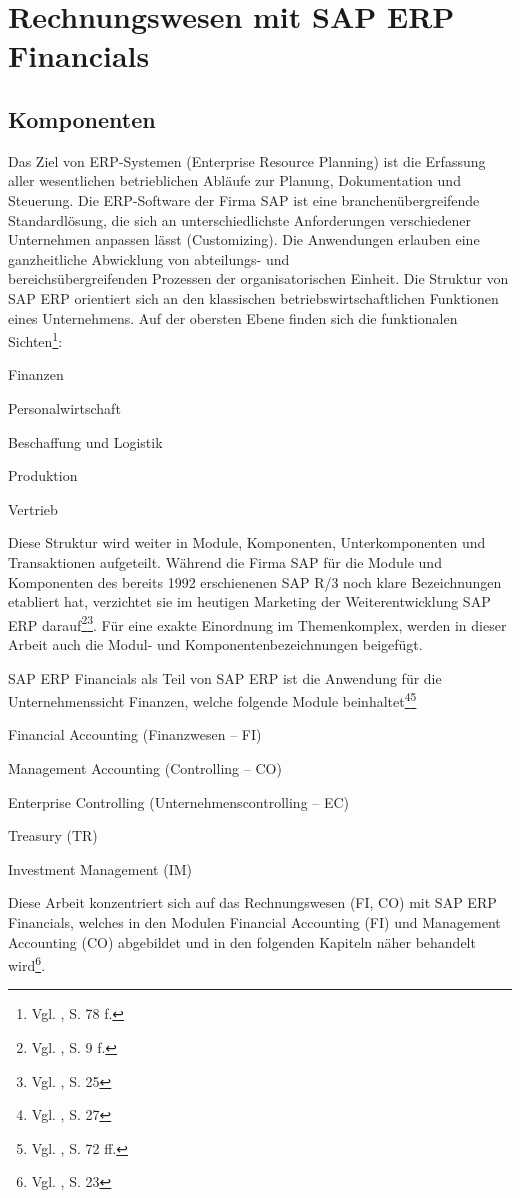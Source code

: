 \section{Rechnungswesen mit SAP ERP Financials}
\subsection{Komponenten}
\label{sec:Komponenten}
Das Ziel von ERP-Systemen (Enterprise Resource Planning) ist die Erfassung aller wesentlichen betrieblichen Abläufe zur Planung, Dokumentation und Steuerung. Die ERP-Software der Firma SAP ist eine branchenübergreifende Standardlösung, die sich an unterschiedlichste Anforderungen verschiedener Unternehmen anpassen lässt (Customizing). Die Anwendungen erlauben eine ganzheitliche Abwicklung von abteilungs- und\\bereichsübergreifenden Prozessen der organisatorischen Einheit. Die Struktur von SAP ERP orientiert sich an den klassischen betriebswirtschaftlichen Funktionen eines Unternehmens. Auf der obersten Ebene finden sich die funktionalen Sichten\footnote{Vgl. \cite{Bauer2009}, S. 78 f.}:
\begin{compactitem}
\item Finanzen
\item Personalwirtschaft
\item Beschaffung und Logistik
\item Produktion
\item Vertrieb
\end{compactitem}
Diese Struktur wird weiter in Module, Komponenten, Unterkomponenten und Transaktionen aufgeteilt. Während die Firma SAP für die Module und Komponenten des bereits 1992 erschienenen SAP R/3 noch klare Bezeichnungen etabliert hat, verzichtet sie im heutigen Marketing der Weiterentwicklung SAP ERP darauf\footnote{Vgl. \cite{Klein2010}, S. 9 f.}\footnote{Vgl. \cite{Hefner2001}, S. 25}. Für eine exakte Einordnung im Themenkomplex, werden in dieser Arbeit auch die Modul- und Komponentenbezeichnungen beigefügt.

SAP ERP Financials als Teil von SAP ERP ist die Anwendung für die Unternehmenssicht Finanzen, welche folgende Module beinhaltet\footnote{Vgl. \cite{Hefner2001}, S. 27}\footnote{Vgl. \cite{Muir2009}, S. 72 ff.}
\begin{compactitem}
\item Financial Accounting (Finanzwesen -- FI)
\item Management Accounting (Controlling -- CO)
\item Enterprise Controlling (Unternehmenscontrolling -- EC)
\item Treasury (TR)
\item Investment Management (IM)
\end{compactitem}
Diese Arbeit konzentriert sich auf das Rechnungswesen (FI, CO) mit SAP ERP Financials, welches in den Modulen Financial Accounting (FI) und Management Accounting (CO) abgebildet und in den folgenden Kapiteln näher behandelt wird\footnote{Vgl. \cite{Patel2009}, S. 23}.

